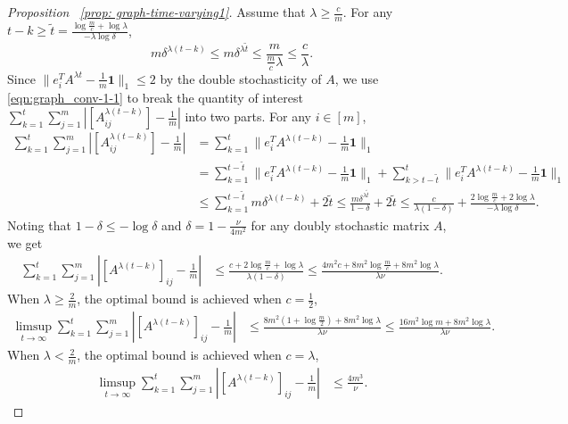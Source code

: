 \documentclass[twoside,11pt]{article}
\numberwithin{equation}{section}
\newcommand{\ones}{\mathbf{1}}
\begin{document}
{\begin{proof} [Proposition ~\ref{prop: graph-time-varying1}]
    
   Assume that $\lambda \geq \frac{c}{m}$.  For any $t - k \geq \tilde t = \frac{\log \frac{m}{c} + \log \lambda}{- \lambda \log \delta}$, 
    \begin{equation*}
        m \delta^{\lambda(t-k)} \leq  m \delta^{\lambda \tilde t} \leq \frac{m}{\frac{m}{c} \lambda} \leq \frac{c}{\lambda}. 
    \end{equation*}
    Since $ \|e_i^T A^{\lambda t} - \frac{1}{m} \ones \|_1 \leq 2$ by the double stochasticity of $A$, we use \eqref{eqn:graph_conv-1-1} to break the quantity of interest $\sum_{k = 1}^t \sum_{j = 1}^m |[A^{\lambda(t-k)}_{ij}] - \frac{1}{m}|$ into two parts. For any $i \in [m]$, 
    \begin{align*}
        \sum_{k = 1}^t \sum_{j = 1}^m |[A^{\lambda(t-k)}_{ij}] - \frac{1}{m}|  &=  \sum_{k = 1}^t \| e_i^T A^{\lambda(t-k)}- \frac{1}{m} \ones \|_1  \\
        &=  \sum_{k = 1}^{t - \tilde t} \| e_i^T A^{\lambda(t-k)} - \frac{1}{m} \ones \|_1 + \sum_{k > t - \tilde t}^{t} \| e_i^T A^{\lambda(t-k)} - \frac{1}{m} \ones \|_1 \\
        &\leq \sum_{k = 1}^{t - \tilde t}  m \delta^{\lambda(t-k)} + 2 \tilde t \leq \frac{m \delta^{\lambda \tilde t}}{1 - \delta} + 2 \tilde t \leq \frac{c}{\lambda(1 - \delta)} + \frac{2 \log \frac{m}{c}+2 \log \lambda}{-\lambda \log \delta}. 
    \end{align*}
    Noting that $1 - \delta \leq - \log \delta$ and $\delta = 1 - \frac{\nu}{4 m^2}$ for any doubly stochastic matrix $A$,  we get 
    \begin{align*}
         \sum_{k = 1}^t \sum_{j = 1}^m |\left[ A^{\lambda(t - k)} \right]_{ij} - \frac{1}{m}| & \leq  \frac{c + 2 \log \frac{m}{c} + \log \lambda}{\lambda(1 - \delta)}  \leq  \frac{4m^2 c + 8 m^2 \log \frac{m}{c} + 8 m^2\log \lambda}{\lambda \nu}. 
    \end{align*}
When $\lambda \geq \frac{2}{m}$, the optimal bound is achieved when $c = \frac{1}{2}$, 
\begin{align*}
    \limsup_{t \to \infty}  \sum_{k = 1}^t \sum_{j = 1}^m |\left[ A^{\lambda(t - k)} \right]_{ij} - \frac{1}{m}| &\leq   \frac{8m^2 (1 + \log \frac{m}{2}) + 8 m^2\log \lambda}{\lambda \nu} \leq \frac{16m^2 \log m + 8 m^2\log \lambda}{\lambda \nu}. 
\end{align*}
When $\lambda < \frac{2}{m}$,  the optimal bound is achieved when $c = \lambda $, 
\begin{align*}
     \limsup_{t \to \infty}  \sum_{k = 1}^t \sum_{j = 1}^m |\left[ A^{\lambda(t - k)} \right]_{ij} - \frac{1}{m}| &\leq  \frac{4m^3}{\nu}. 

\end{align*}
\end{proof}}
\end{document}
